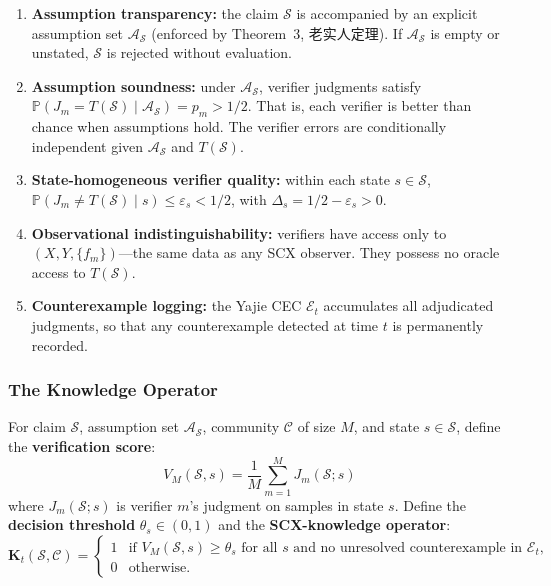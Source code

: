 \begin{assumption}
\label{ax:epistemic}
\begin{enumerate}[label=\textbf{E\arabic*}, leftmargin=*, itemsep=4pt]
  \item \textbf{Assumption transparency:} the claim $\mathcal{S}$ is
    accompanied by an explicit assumption set $\mathcal{A}_{\mathcal{S}}$
    (enforced by Theorem~3, 老实人定理). If $\mathcal{A}_{\mathcal{S}}$
    is empty or unstated, $\mathcal{S}$ is rejected without evaluation.
  \item \textbf{Assumption soundness:} under $\mathcal{A}_{\mathcal{S}}$,
    verifier judgments satisfy
    $\mathbb{P}(J_m = T(\mathcal{S}) \mid \mathcal{A}_{\mathcal{S}}) = p_m > 1/2$.
    That is, each verifier is better than chance when assumptions hold.
    The verifier errors are conditionally independent given
    $\mathcal{A}_{\mathcal{S}}$ and $T(\mathcal{S})$.
  \item \textbf{State-homogeneous verifier quality:} within each state
    $s\in\mathcal{S}$, $\mathbb{P}(J_m \neq T(\mathcal{S}) \mid s) \leq
    \varepsilon_s < 1/2$, with $\Delta_s = 1/2 - \varepsilon_s > 0$.
  \item \textbf{Observational indistinguishability:} verifiers have access
    only to $(X,Y,\{f_m\})$---the same data as any SCX observer. They
    possess no oracle access to $T(\mathcal{S})$.
  \item \textbf{Counterexample logging:} the Yajie CEC $\mathcal{E}_t$
    accumulates all adjudicated judgments, so that any counterexample
    detected at time $t$ is permanently recorded.
\end{enumerate}
\end{assumption}

\subsubsection{The Knowledge Operator}
\label{sec:knowledge-operator}

\begin{definition}
\label{def:K-operator}
For claim $\mathcal{S}$, assumption set $\mathcal{A}_{\mathcal{S}}$,
community $\mathcal{C}$ of size $M$, and state $s\in\mathcal{S}$, define
the \textbf{verification score}:
\[
V_M(\mathcal{S}, s) = \frac{1}{M}\sum_{m=1}^{M} J_m(\mathcal{S}; s)
\]
where $J_m(\mathcal{S}; s)$ is verifier $m$'s judgment on samples in
state $s$. Define the \textbf{decision threshold} $\theta_s \in (0,1)$
and the \textbf{SCX-knowledge operator}:
\[
\mathbf{K}_{t}(\mathcal{S}, \mathcal{C}) =
\begin{cases}
1 & \text{if } V_M(\mathcal{S}, s) \geq \theta_s \text{ for all } s
      \text{ and no unresolved counterexample in } \mathcal{E}_t,\\
0 & \text{otherwise.}
\end{cases}
\]
\end{definition}

